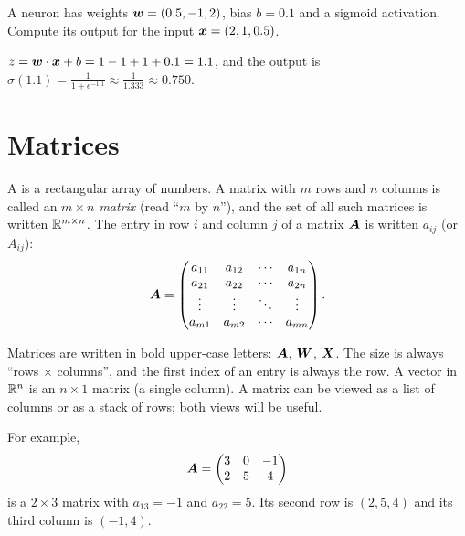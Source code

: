 \begin{exercise}
A neuron has weights $\bm{w} = (0.5, -1, 2)$, bias $b = 0.1$ and a sigmoid
activation. Compute its output for the input $\bm{x} = (2, 1, 0.5)$.
\end{exercise}
\begin{solution}
$z = \bm{w}\cdot\bm{x} + b = 1 - 1 + 1 + 0.1 = 1.1$, and the output is
$\sigma(1.1) = \tfrac{1}{1 + e^{-1.1}} \approx \tfrac{1}{1.333} \approx 0.750$.
\end{solution}

\section{Matrices}\label{sec:matrices}

\begin{definition}[Matrix]\label{def:matrix}
A  is a rectangular array of numbers. A matrix with $m$ rows and
$n$ columns is called an \emph{$m\times n$ matrix} (read ``$m$ by $n$''), and
the set of all such matrices is written $\mathbb{R}^{m\times n}$. The entry in row $i$
and column $j$ of a matrix $\bm{A}$ is written $a_{ij}$ (or $A_{ij}$):
\[
  \bm{A} = \begin{pmatrix}
    a_{11} & a_{12} & \cdots & a_{1n}\\
    a_{21} & a_{22} & \cdots & a_{2n}\\
    \vdots & \vdots & \ddots & \vdots\\
    a_{m1} & a_{m2} & \cdots & a_{mn}
  \end{pmatrix}.
\]
\end{definition}

\begin{notation}
Matrices are written in bold upper-case letters: $\bm{A}$, $\bm{W}$, $\bm{X}$. The
size is always ``rows $\times$ columns'', and the first index of an entry is
always the row. A vector in $\mathbb{R}^n$ is an $n \times 1$ matrix (a single
column). A matrix can be viewed as a list of columns or as a stack of rows;
both views will be useful.
\end{notation}

For example,
\[
  \bm{A} = \begin{pmatrix} 3 & 0 & -1\\ 2 & 5 & 4 \end{pmatrix}
\]
is a $2\times3$ matrix with $a_{13} = -1$ and $a_{22} = 5$. Its second row is
$(2, 5, 4)$ and its third column is $(-1, 4)$.

